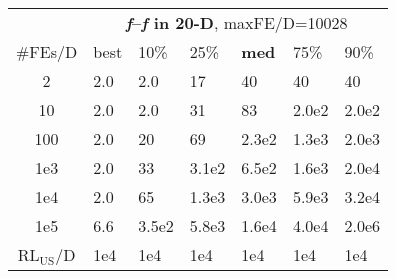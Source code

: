 \begin{tabular}{c|llllll}
 & \multicolumn{6}{|c}{\textbf{\textit{f}\raisebox{-0.35ex}{1}--\textit{f}\raisebox{-0.35ex}{24} in 20-D}, maxFE/D=10028}\\
\#FEs/D & best & 10\% & 25\% & \textbf{med} & 75\% & 90\%\\
2 & \hspace*{1ex}2.0 & \hspace*{1ex}2.0 & 17 & 40 & 40 & 40\\
10 & \hspace*{1ex}2.0 & \hspace*{1ex}2.0 & 31 & 83 & 2.0e2 & 2.0e2\\
100 & \hspace*{1ex}2.0 & 20 & 69 & 2.3e2 & 1.3e3 & 2.0e3\\
1e3 & \hspace*{1ex}2.0 & 33 & 3.1e2 & 6.5e2 & 1.6e3 & 2.0e4\\
1e4 & \hspace*{1ex}2.0 & 65 & 1.3e3 & 3.0e3 & 5.9e3 & 3.2e4\\
1e5 & \hspace*{1ex}6.6 & 3.5e2 & 5.8e3 & 1.6e4 & 4.0e4 & 2.0e6\\
$\text{RL}_{\text{US}}$/D & 1e4 & 1e4 & 1e4 & 1e4 & 1e4 & 1e4
\end{tabular}
